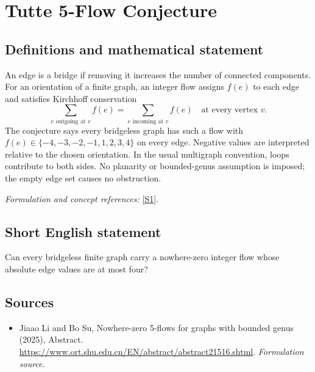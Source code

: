 \documentclass[11pt]{article}
\begin{document}
\section*{\texorpdfstring{Tutte 5-Flow Conjecture}{Tutte 5-Flow Conjecture}}\label{299}
\subsection{Definitions and mathematical statement}
An edge is a bridge if removing it increases the number of connected components. For an orientation of a finite graph, an integer flow assigns $f(e)$ to each edge and satisfies Kirchhoff conservation
\[
 \sum_{e\text{ outgoing at }v}f(e)=\sum_{e\text{ incoming at }v}f(e)
 \quad\text{at every vertex }v.
\]
The conjecture says every bridgeless graph has such a flow with
$f(e)\in\{-4,-3,-2,-1,1,2,3,4\}$ on every edge. Negative values are interpreted relative to the chosen orientation. In the usual multigraph convention, loops contribute to both sides. No planarity or bounded-genus assumption is imposed; the empty edge set causes no obstruction.
\par\smallskip\textit{Formulation and concept references:} \href{https://www.ort.shu.edu.cn/EN/abstract/abstract21516.shtml}{[S1]}.

\subsection{Short English statement}
Can every bridgeless finite graph carry a nowhere-zero integer flow whose absolute edge values are at most four?
\subsection{Sources}
\begin{itemize}
\item[S1]Jiaao Li and Bo Su, Nowhere-zero 5-flows for graphs with bounded genus (2025), Abstract.
\url{https://www.ort.shu.edu.cn/EN/abstract/abstract21516.shtml}.
\textit{Formulation source.}
\end{itemize}
\end{document}
